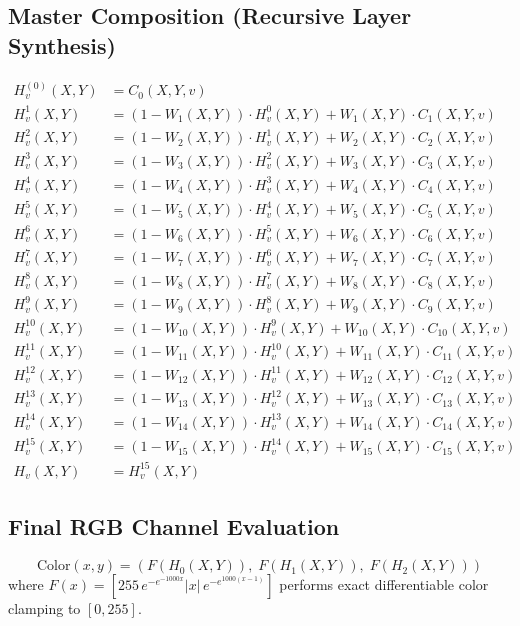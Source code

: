 \documentclass[10pt]{article}
\begin{document}
\subsection*{Master Composition (Recursive Layer Synthesis)}
\begin{align*}
  H_v^{(0)}(X,Y) &= C_0(X,Y,v) \\[4pt]
  H_v^{1}(X,Y) &= \left(1 - W_{1}(X,Y)\right)\cdot H_v^{0}(X,Y) + W_{1}(X,Y)\cdot C_{1}(X,Y,v) \\[3pt]
  H_v^{2}(X,Y) &= \left(1 - W_{2}(X,Y)\right)\cdot H_v^{1}(X,Y) + W_{2}(X,Y)\cdot C_{2}(X,Y,v) \\[3pt]
  H_v^{3}(X,Y) &= \left(1 - W_{3}(X,Y)\right)\cdot H_v^{2}(X,Y) + W_{3}(X,Y)\cdot C_{3}(X,Y,v) \\[3pt]
  H_v^{4}(X,Y) &= \left(1 - W_{4}(X,Y)\right)\cdot H_v^{3}(X,Y) + W_{4}(X,Y)\cdot C_{4}(X,Y,v) \\[3pt]
  H_v^{5}(X,Y) &= \left(1 - W_{5}(X,Y)\right)\cdot H_v^{4}(X,Y) + W_{5}(X,Y)\cdot C_{5}(X,Y,v) \\[3pt]
  H_v^{6}(X,Y) &= \left(1 - W_{6}(X,Y)\right)\cdot H_v^{5}(X,Y) + W_{6}(X,Y)\cdot C_{6}(X,Y,v) \\[3pt]
  H_v^{7}(X,Y) &= \left(1 - W_{7}(X,Y)\right)\cdot H_v^{6}(X,Y) + W_{7}(X,Y)\cdot C_{7}(X,Y,v) \\[3pt]
  H_v^{8}(X,Y) &= \left(1 - W_{8}(X,Y)\right)\cdot H_v^{7}(X,Y) + W_{8}(X,Y)\cdot C_{8}(X,Y,v) \\[3pt]
  H_v^{9}(X,Y) &= \left(1 - W_{9}(X,Y)\right)\cdot H_v^{8}(X,Y) + W_{9}(X,Y)\cdot C_{9}(X,Y,v) \\[3pt]
  H_v^{10}(X,Y) &= \left(1 - W_{10}(X,Y)\right)\cdot H_v^{9}(X,Y) + W_{10}(X,Y)\cdot C_{10}(X,Y,v) \\[3pt]
  H_v^{11}(X,Y) &= \left(1 - W_{11}(X,Y)\right)\cdot H_v^{10}(X,Y) + W_{11}(X,Y)\cdot C_{11}(X,Y,v) \\[3pt]
  H_v^{12}(X,Y) &= \left(1 - W_{12}(X,Y)\right)\cdot H_v^{11}(X,Y) + W_{12}(X,Y)\cdot C_{12}(X,Y,v) \\[3pt]
  H_v^{13}(X,Y) &= \left(1 - W_{13}(X,Y)\right)\cdot H_v^{12}(X,Y) + W_{13}(X,Y)\cdot C_{13}(X,Y,v) \\[3pt]
  H_v^{14}(X,Y) &= \left(1 - W_{14}(X,Y)\right)\cdot H_v^{13}(X,Y) + W_{14}(X,Y)\cdot C_{14}(X,Y,v) \\[3pt]
  H_v^{15}(X,Y) &= \left(1 - W_{15}(X,Y)\right)\cdot H_v^{14}(X,Y) + W_{15}(X,Y)\cdot C_{15}(X,Y,v) \\[3pt]
  H_v(X,Y) &= H_v^{15}(X,Y)
\end{align*}

\subsection*{Final RGB Channel Evaluation}
\[
  \text{Color}(x,y) = \left( F\left(H_0(X,Y)\right), \; F\left(H_1(X,Y)\right), \; F\left(H_2(X,Y)\right) \right)
\]
where $F(x) = \left[255\,e^{-e^{-1000x}}|x|\,e^{-e^{1000(x-1)}}\right]$ performs exact differentiable color clamping to $[0, 255]$.
\end{document}
